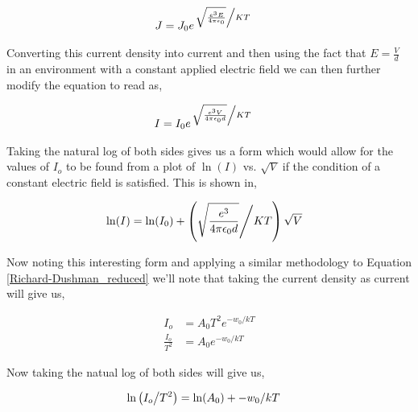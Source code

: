 \begin{align}
   & J = J_0 e^{\left. \sqrt{\frac{e^3 E}{4 \pi \epsilon_0}} \middle/ KT \right.}
\end{align}

Converting this current density into current and then using the fact that $ E = \frac{V}{d}$ in an environment with a constant applied electric field we can then further modify the equation to read as,

\begin{align}
   & I = I_0 e^{\left. \sqrt{\frac{e^3 V}{4 \pi \epsilon_0 d}} \middle/ KT \right.}
\end{align}

Taking the natural log of both sides gives us a form which would allow for the values of $I_o$ to be found from a plot of $\ln(I)$ vs. $\sqrt{V}$ if the condition of a constant electric field is satisfied. This is shown in,

\begin{align}
   & \ln(I) = \ln(I_0) + \left( \sqrt{\frac{e^3}{4 \pi \epsilon_0 d}} \middle/ KT \right) \sqrt{V} \label{plot_1eqn}
\end{align}

Now noting this interesting form and applying a similar methodology to Equation \ref{Richard-Dushman_reduced} we'll note that taking the current density as current will give us,

\begin{align}
   I_o & = A_0 T^2e^{-w_0/kT} \\
   \frac{I_o}{T^2} &= A_0 e^{-w_0/kT}
\end{align}

Now taking the natual log of both sides will give us,

\begin{align}
    \ln\left(I_o \middle/ T^2\right) & = \ln(A_0) + -w_0/kT \label{plot_2eqn}
\end{align}




